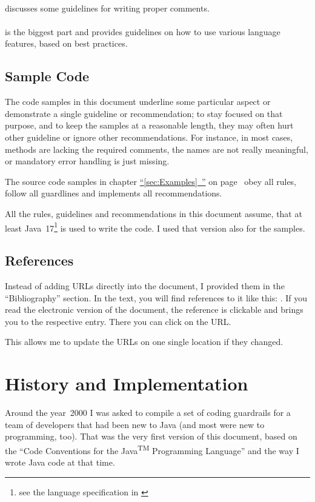 \documentclass[11pt,a4paper, titlepage, parskip=half, headsepline, footsepline, cleardoublepage=current, headheight=1cm]{scrbook}
\newcommand*{\tqfullvref}[1]{\hyperref[{#1}]{“\ref*{#1}~\nameref*{#1}”} on page~\pageref{#1}}
\begin{document}
\paragraph{} discusses some guidelines for writing proper comments.

\paragraph{} is the biggest part and provides guidelines on how to use various language features, based on best practices.

\subsection{Sample Code}
The code samples in this document underline some particular aspect or demonstrate a single guideline or recommendation; to stay focused on that purpose, and to keep the samples at a reasonable length, they may often hurt other guideline or ignore other recommendations. For instance, in most cases, methods are lacking the required comments, the names are not really meaningful, or mandatory error handling is just missing.

The source code samples in chapter \tqfullvref{sec:Examples} obey all rules, follow all guardlines and implements all recommendations.

All the rules, guidelines and recommendations in this document assume, that at least Java~17\footnote{see the language specification in \autocite{ORACLE_DOC_LANGUAGE_SPECIFICATION}} is used to write the code. I used that version also for the samples.

\subsection{References}
Instead of adding URLs directly into the document, I provided them in the “Bibliography” section. In the text, you will find references to it like this: \autocite{ORACLE_DOC_LANGUAGE_SPECIFICATION}. If you read the electronic version of the document, the reference is clickable and brings you to the respective entry. There you can click on the URL.

This allows me to update the URLs on one single location if they changed. 

\section{History and Implementation}
Around the year~2000 I was asked to compile a set of coding guardrails for a team of developers that had been new to Java (and most were new to programming, too). That was the very first version of this document, based on the “Code Conventions for the Java\textsuperscript{TM} Programming Language”\autocite{SUN_CODE_CONVENTIONS} and the way I wrote Java code at that time.
\end{document}
